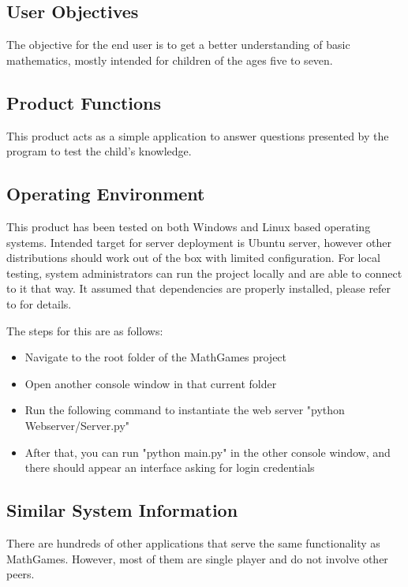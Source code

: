 \documentclass[12pt]{article}
\begin{document}
\subsection{User Objectives}

The objective for the end user is to get a better understanding of basic mathematics, mostly intended for children of the ages five to seven.

\subsection{Product Functions}

This product acts as a simple application to answer questions presented by the program to test the child's knowledge.

\subsection{Operating Environment}

\label{marker}

This product has been tested on both Windows and Linux based operating systems.
Intended target for server deployment is Ubuntu server, however other distributions should work out of the box with limited configuration.
For local testing, system administrators can run the project locally and are able to connect to it that way.
It assumed that dependencies are properly installed, please refer to  \underline{} for details.

The steps for this are as follows:

\begin{itemize}
\item Navigate to the root folder of the MathGames project
\item Open another console window in that current folder
\item Run the following command to instantiate the web server "python Webserver/Server.py"
\item After that, you can run "python main.py" in the other console window, and there should appear an interface asking for login credentials
\end{itemize}

\subsection{Similar System Information}

There are hundreds of other applications that serve the same functionality as MathGames.
However, most of them are single player and do not involve other peers.
\end{document}
